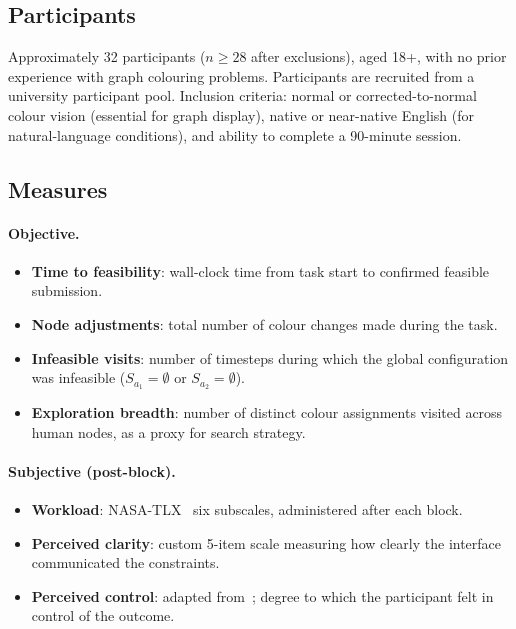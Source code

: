 \documentclass[10pt]{article}
\theoremstyle{definition}
\begin{document}
\subsection{Participants}

Approximately 32 participants ($n \geq 28$ after exclusions), aged 18+, with no prior experience
with graph colouring problems.  Participants are recruited from a university participant pool.
Inclusion criteria: normal or corrected-to-normal colour vision (essential for graph display),
native or near-native English (for natural-language conditions), and ability to complete a
90-minute session.

\subsection{Measures}

\paragraph{Objective.}
\begin{itemize}
  \item \textbf{Time to feasibility}: wall-clock time from task start to confirmed feasible
        submission.
  \item \textbf{Node adjustments}: total number of colour changes made during the task.
  \item \textbf{Infeasible visits}: number of timesteps during which the global configuration
        was infeasible ($S_{a_1} = \emptyset$ or $S_{a_2} = \emptyset$).
  \item \textbf{Exploration breadth}: number of distinct colour assignments visited across
        human nodes, as a proxy for search strategy.
\end{itemize}

\paragraph{Subjective (post-block).}
\begin{itemize}
  \item \textbf{Workload}: NASA-TLX~\citep{hart1988development} six subscales, administered after
        each block.
  \item \textbf{Perceived clarity}: custom 5-item scale measuring how clearly the interface
        communicated the constraints.
  \item \textbf{Perceived control}: adapted from~\citep{hoffman2019evaluating}; degree to which
        the participant felt in control of the outcome.
\end{itemize}
\end{document}
